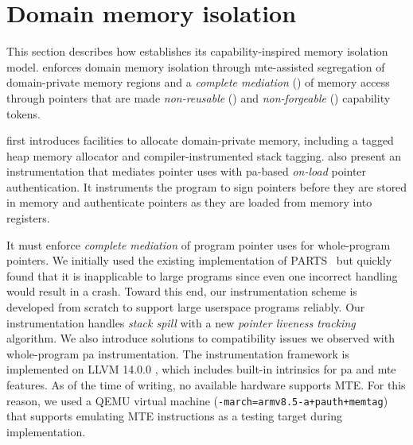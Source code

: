 
\section{Domain memory isolation}
\label{sec:design:instrumentation}
\label{sec:instrumentation}

This section describes how \thename establishes its capability-inspired memory isolation model.
\thename enforces domain memory isolation through \gls{mte}-assisted segregation of domain-private memory regions and a \emph{complete mediation} (\srcompmed) of memory access through pointers that are made \emph{non-reusable} (\srreuse) and \emph{non-forgeable} (\srforge) capability tokens.

\thename first introduces facilities to allocate domain-private memory, including a tagged heap memory allocator and compiler-instrumented stack tagging.
\thename also present an instrumentation that mediates pointer uses with \gls{pa}-based \emph{on-load} pointer authentication.
It instruments the program to sign pointers before they are stored in memory and authenticate pointers as they are loaded from memory into registers.

It must enforce \emph{complete mediation} of program pointer uses for whole-program pointers.
We initially used the existing implementation of PARTS~\cite{pac-it-up} but quickly found that it is inapplicable to large programs since even one incorrect handling would result in a crash.
Toward this end, our instrumentation scheme is developed from scratch to support large userspace programs reliably.
Our instrumentation handles \emph{stack spill} with a new \emph{pointer liveness tracking}  algorithm.
We also introduce solutions to compatibility issues we observed with whole-program \gls{pa} instrumentation.
The instrumentation framework is implemented on LLVM 14.0.0 \cite{llvm}, which includes built-in intrinsics for \gls{pa} and \gls{mte} features.
As of the time of writing, no available hardware supports MTE.
For this reason, we used a QEMU virtual machine (\texttt{-march=armv8.5-a+pauth+memtag}) that supports emulating MTE instructions as a testing target during implementation.

